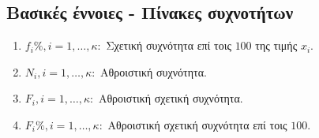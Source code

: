 \documentclass[a4paper,11pt,twoside]{article}
\begin{document}
\subsection{Βασικές έννοιες - Πίνακες συχνοτήτων}
\begin{enumerate}
\item $f_i\%,i=1,\ldots,\kappa : $ Σχετική συχνότητα επί τοις $100$ της τιμής $x_i$.
\item $N_i,i=1,\ldots,\kappa : $ Αθροιστική συχνότητα.
\item $F_i,i=1,\ldots,\kappa : $ Αθροιστική σχετική συχνότητα.
\item $F_i\%,i=1,\ldots,\kappa : $ Αθροιστική σχετική συχνότητα επί τοις $100$.


\end{enumerate}
\end{document}
